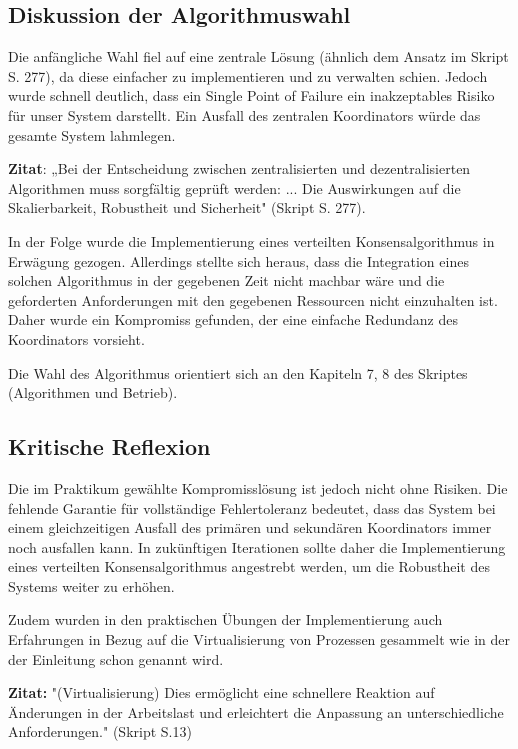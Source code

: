 \documentclass{article}
\begin{document}
\subsection{Diskussion der Algorithmuswahl}

Die anfängliche Wahl fiel auf eine zentrale Lösung (ähnlich dem Ansatz im Skript S. 277), da diese einfacher zu implementieren und zu verwalten schien. Jedoch wurde schnell deutlich, dass ein Single Point of Failure ein inakzeptables Risiko für unser System darstellt. Ein Ausfall des zentralen Koordinators würde das gesamte System lahmlegen.

\textbf{Zitat}: „Bei der Entscheidung zwischen zentralisierten und dezentralisierten Algorithmen muss sorgfältig geprüft werden: ... Die Auswirkungen auf die Skalierbarkeit, Robustheit und Sicherheit" (Skript S. 277).

In der Folge wurde die Implementierung eines verteilten Konsensalgorithmus in Erwägung gezogen. Allerdings stellte sich heraus, dass die Integration eines solchen Algorithmus in der gegebenen Zeit nicht machbar wäre und die geforderten Anforderungen mit den gegebenen Ressourcen nicht einzuhalten ist. Daher wurde ein Kompromiss gefunden, der eine einfache Redundanz des Koordinators vorsieht.

Die Wahl des Algorithmus orientiert sich an den Kapiteln 7, 8 des Skriptes (Algorithmen und Betrieb).

\subsection{Kritische Reflexion}

Die im Praktikum gewählte Kompromisslösung ist jedoch nicht ohne Risiken. Die fehlende Garantie für vollständige Fehlertoleranz bedeutet, dass das System bei einem gleichzeitigen Ausfall des primären und sekundären Koordinators immer noch ausfallen kann. In zukünftigen Iterationen sollte daher die Implementierung eines verteilten Konsensalgorithmus angestrebt werden, um die Robustheit des Systems weiter zu erhöhen.

Zudem wurden in den praktischen Übungen der Implementierung auch Erfahrungen in Bezug auf die Virtualisierung von Prozessen gesammelt wie in der der Einleitung schon genannt wird.

\textbf{Zitat:} "(Virtualisierung) Dies ermöglicht eine schnellere Reaktion auf Änderungen in der Arbeitslast und erleichtert die Anpassung an unterschiedliche Anforderungen." (Skript S.13)
\end{document}
